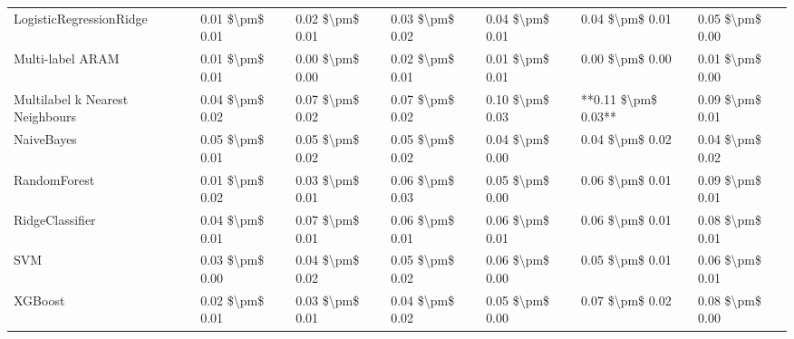 \begin{tabular}{lllllll}
        LogisticRegressionRidge & 0.01 \$\textbackslash pm\$ 0.01 &           0.02 \$\textbackslash pm\$ 0.01 &       0.03 \$\textbackslash pm\$ 0.02 &        0.04 \$\textbackslash pm\$ 0.01 &                         0.04 \$\textbackslash pm\$ 0.01 &     0.05 \$\textbackslash pm\$ 0.00 \\
               Multi-label ARAM & 0.01 \$\textbackslash pm\$ 0.01 &           0.00 \$\textbackslash pm\$ 0.00 &       0.02 \$\textbackslash pm\$ 0.01 &        0.01 \$\textbackslash pm\$ 0.01 &                         0.00 \$\textbackslash pm\$ 0.00 &     0.01 \$\textbackslash pm\$ 0.00 \\
Multilabel k Nearest Neighbours & 0.04 \$\textbackslash pm\$ 0.02 &           0.07 \$\textbackslash pm\$ 0.02 &       0.07 \$\textbackslash pm\$ 0.02 &        0.10 \$\textbackslash pm\$ 0.03 &                     **0.11 \$\textbackslash pm\$ 0.03** &     0.09 \$\textbackslash pm\$ 0.01 \\
                     NaiveBayes & 0.05 \$\textbackslash pm\$ 0.01 &           0.05 \$\textbackslash pm\$ 0.02 &       0.05 \$\textbackslash pm\$ 0.02 &        0.04 \$\textbackslash pm\$ 0.00 &                         0.04 \$\textbackslash pm\$ 0.02 &     0.04 \$\textbackslash pm\$ 0.02 \\
                   RandomForest & 0.01 \$\textbackslash pm\$ 0.02 &           0.03 \$\textbackslash pm\$ 0.01 &       0.06 \$\textbackslash pm\$ 0.03 &        0.05 \$\textbackslash pm\$ 0.00 &                         0.06 \$\textbackslash pm\$ 0.01 &     0.09 \$\textbackslash pm\$ 0.01 \\
                RidgeClassifier & 0.04 \$\textbackslash pm\$ 0.01 &           0.07 \$\textbackslash pm\$ 0.01 &       0.06 \$\textbackslash pm\$ 0.01 &        0.06 \$\textbackslash pm\$ 0.01 &                         0.06 \$\textbackslash pm\$ 0.01 &     0.08 \$\textbackslash pm\$ 0.01 \\
                            SVM & 0.03 \$\textbackslash pm\$ 0.00 &           0.04 \$\textbackslash pm\$ 0.02 &       0.05 \$\textbackslash pm\$ 0.02 &        0.06 \$\textbackslash pm\$ 0.00 &                         0.05 \$\textbackslash pm\$ 0.01 &     0.06 \$\textbackslash pm\$ 0.01 \\
                        XGBoost & 0.02 \$\textbackslash pm\$ 0.01 &           0.03 \$\textbackslash pm\$ 0.01 &       0.04 \$\textbackslash pm\$ 0.02 &        0.05 \$\textbackslash pm\$ 0.00 &                         0.07 \$\textbackslash pm\$ 0.02 &     0.08 \$\textbackslash pm\$ 0.00 \\
\bottomrule
\end{tabular}
